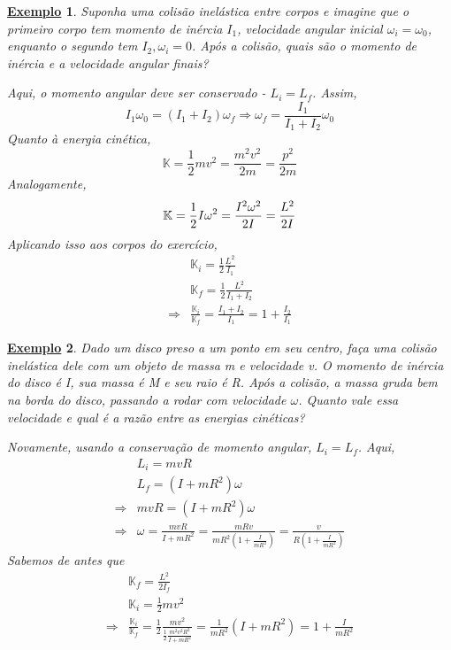 \documentclass{article}
\newtheorem{example}{\underline{Exemplo}}
\begin{document}
\begin{example}
  Suponha uma colisão inelástica entre corpos e imagine que o primeiro corpo tem momento de inércia \(I_{1}\), velocidade angular inicial \(\omega_i = \omega_{0}\),
  enquanto o segundo tem \(I_{2}, \omega _{i} = 0\). Após a colisão, quais são o momento de inércia e a velocidade angular finais?

  Aqui, o momento angular deve ser conservado - \(L_{i} = L_{f}\). Assim,
  \[
    I_{1}\omega_{0} = (I_{1}+I_{2})\omega_{f} \Rightarrow \omega_{f} = \frac{I_{1}}{I_{1}+I_{2}}\omega_{0}
  \]
  Quanto à energia cinética, 
  \[
    \mathbb{K} = \frac{1}{2}mv^{2} = \frac{m^{2}v^{2}}{2m} = \frac{p^{2}}{2m}
  \]
  Analogamente,
  \[
    \mathbb{K} = \frac{1}{2}I\omega^{2} = \frac{I^{2}\omega^{2}}{2I} = \frac{L^{2}}{2I}\\
  \]
  Aplicando isso aos corpos do exercício, 
  \begin{align*}
   &\mathbb{K}_{i} = \frac{1}{2}\frac{L^{2}}{I_{1}}\\
   &\mathbb{K}_{f} = \frac{1}{2}\frac{L^{2}}{I_{1}+I_{2}}\\
    \Rightarrow& \frac{\mathbb{K}_{i}}{\mathbb{K}_{f}} = \frac{I_{1}+I_{2}}{I_{1}} = 1 + \frac{I_{2}}{I_{1}}
  \end{align*}
\end{example}
\begin{example}
  Dado um disco preso a um ponto em seu centro, faça uma colisão inelástica dele com um objeto de massa m e velocidade v. O momento de inércia do disco é I, sua massa é M e seu raio é R.
  Após a colisão, a massa gruda bem na borda do disco, passando a rodar com velocidade \(\omega \). Quanto vale essa velocidade e qual é a razão entre as energias cinéticas?

  Novamente, usando a conservação de momento angular, \(L_{i} = L_{f}\). Aqui, 
  \begin{align*}
   &L_{i} = mvR\\
   &L_{f} = (I+mR^{2})\omega\\
    \Rightarrow& mvR = (I+mR^{2})\omega\\
    \Rightarrow& \omega = \frac{mvR}{I+mR^{2}} = \frac{mRv}{mR^{2}(1+\frac{I}{mR^{2}})} = \frac{v}{R(1+\frac{I}{mR^{2}})}
  \end{align*}
  Sabemos de antes que 
  \begin{align*}
   &\mathbb{K}_{f}=\frac{L^{2}}{2I_{f}}\\
   &\mathbb{K}_{i} = \frac{1}{2}mv^{2}\\
    \Rightarrow& \frac{\mathbb{K}_{i}}{\mathbb{K}_{f}} = \frac{1}{2}\frac{mv^{2}}{\frac{1}{2}\frac{m^{2}v^{2}R^{2}}{I+mR^{2}}} = \frac{1}{mR^{2}}(I+mR^{2}) = 1 + \frac{I}{mR^{2}}
  \end{align*}
\end{example}
\end{document}
